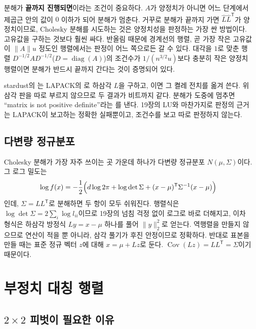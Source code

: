 분해가 \textbf{끝까지 진행되면}이라는 조건이 중요하다. $A$가 양정치가 아니면 어느 단계에서 제곱근 안의 값이 $0$ 이하가 되어 분해가 멈춘다. 거꾸로 분해가 끝까지 가면 $\hat L\hat L^{\mathsf T}$가 양정치이므로, Cholesky 분해를 시도하는 것은 양정치성을 판정하는 가장 싼 방법이다. 고유값을 구하는 것보다 훨씬 싸다. 반올림 때문에 경계선의 행렬, 곧 가장 작은 고유값이 $\|A\|u$ 정도인 행렬에서는 판정이 어느 쪽으로든 갈 수 있다. 대각을 $1$로 맞춘 행렬 $D^{-1/2}AD^{-1/2}$($D=\operatorname{diag}(A)$)의 조건수가 $1/(n^{3/2}u)$보다 충분히 작은 양정치 행렬이면 분해가 반드시 끝까지 간다는 것이 증명되어 있다\cite{higham2002accuracy}.

\begin{instardust}
stardust의 는 LAPACK의 로 하삼각 $L$을 구하고, 이면 그 켤레 전치를 옮겨 쓴다. 위삼각 판을 따로 부르지 않으므로 두 결과가 비트까지 같다. 분해가 도중에 멈추면 ``matrix is not positive definite''라는 를 낸다. 19장의 LU와 마찬가지로 판정의 근거는 LAPACK이 보고하는 정확한 실패뿐이고, 조건수를 보고 따로 판정하지 않는다.
\end{instardust}

\subsection{다변량 정규분포}

Cholesky 분해가 가장 자주 쓰이는 곳 가운데 하나가 다변량 정규분포 $N(\mu,\Sigma)$이다. 그 로그 밀도는
\[
\log f(x)=-\frac12\Bigl(d\log2\pi+\log\det\Sigma+(x-\mu)^{\mathsf T}\Sigma^{-1}(x-\mu)\Bigr)
\]
인데, $\Sigma=LL^{\mathsf T}$로 분해하면 두 항이 모두 쉬워진다. 행렬식은 $\log\det\Sigma=2\sum_i\log l_{ii}$이므로 19장의 넘침 걱정 없이 로그로 바로 더해지고, 이차 형식은 하삼각 방정식 $Ly=x-\mu$ 하나를 풀어 $\|y\|_2^2$로 얻는다. 역행렬을 만들지 않으므로 연산이 적을 뿐 아니라, 삼각 풀기가 후진 안정이므로 정확하다. 반대로 표본을 만들 때는 표준 정규 벡터 $z$에 대해 $x=\mu+Lz$로 둔다. $\operatorname{Cov}(Lz)=LL^{\mathsf T}=\Sigma$이기 때문이다.

\section{부정치 대칭 행렬}
\label{sec:indefinite}

\subsection{$2\times2$ 피벗이 필요한 이유}


